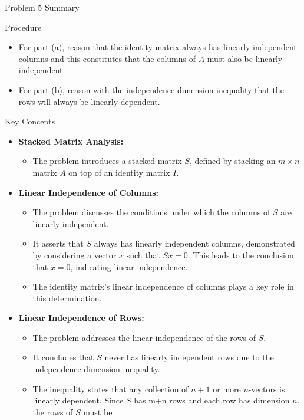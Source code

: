 \begin{summary}{Problem 5 Summary}
    \begin{statement}{Procedure}
        \begin{itemize}
            \item For part (a), reason that the identity matrix always has linearly independent columns and this constitutes that the columns of $A$ must also be linearly independent.
            \item For part (b), reason with the independence-dimension inequality that the rows will always be linearly dependent.
        \end{itemize}
    \end{statement}
    \begin{statement}{Key Concepts}
        \begin{itemize}
            \item \textbf{Stacked Matrix Analysis:}
            \begin{itemize}
                \item The problem introduces a stacked matrix $S$, defined by stacking an $m \times n$ matrix $A$ on top of an identity matrix $I$.
            \end{itemize}
            \item \textbf{Linear Independence of Columns:}
            \begin{itemize}
                \item The problem discusses the conditions under which the columns of $S$ are linearly independent.
                \item It asserts that $S$ always has linearly independent columns, demonstrated by considering a vector $x$ such that $Sx = 0$. This leads to the conclusion that $x = 0$, indicating 
                linear independence.
                \item The identity matrix's linear independence of columns plays a key role in this determination.
            \end{itemize}
            \item \textbf{Linear Independence of Rows:}
            \begin{itemize}
                \item The problem addresses the linear independence of the rows of $S$.
                \item It concludes that $S$ never has linearly independent rows due to the independence-dimension inequality.
                \item The inequality states that any collection of $n + 1$ or more $n$-vectors is linearly dependent. Since $S$ has m+n rows and each row has dimension $n$, the rows of $S$ must be 

\end{itemize}
\end{itemize}
\end{statement}
\end{summary}
